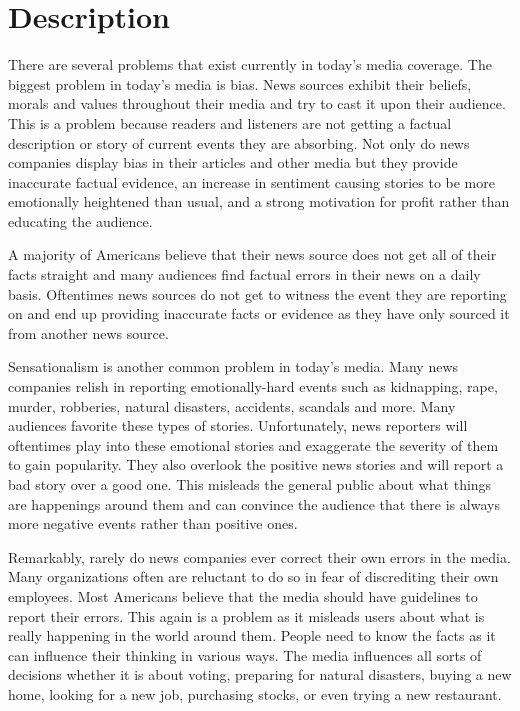 \documentclass[onecolumn, draftclsnofoot,10pt, compsoc]{IEEEtran}
\begin{document}
\section{Description}

There are several problems that exist currently in today’s media coverage.
 The biggest problem in today’s media is bias.
 News sources exhibit their beliefs, morals and values throughout their media and try to cast it upon their audience.
 This is a problem because readers and listeners are not getting a factual description or story of current events they are absorbing.
 Not only do news companies display bias in their articles and other media but they provide inaccurate factual evidence, an increase in sentiment causing stories to be more emotionally heightened than usual, and a strong motivation for profit rather than educating the audience.


A majority of Americans believe that their news source does not get all of their facts straight and many audiences find factual errors in their news on a daily basis.
 Oftentimes news sources do not get to witness the event they are reporting on and end up providing inaccurate facts or evidence as they have only sourced it from another news source.
 

Sensationalism is another common problem in today’s media.
 Many news companies relish in reporting emotionally-hard events such as kidnapping, rape, murder, robberies, natural  disasters, accidents, scandals and more.
 Many audiences favorite these types of stories.
 Unfortunately, news reporters will oftentimes play into these emotional stories and exaggerate the severity of them to gain popularity.
 They also overlook the positive news stories and will report a bad story over a good one.
 This misleads the general public about what things are happenings around them and can convince the audience that there is always more negative events rather than positive ones.


Remarkably, rarely do news companies ever correct their own errors in the media.
 Many organizations often are reluctant to do so in fear of discrediting their own employees.
 Most Americans believe that the media should have guidelines to report their errors.
 This again is a problem as it misleads users about what is really happening in the world around them.
 People need to know the facts as it can influence their thinking in various ways.
 The media influences all sorts of decisions whether it is about voting, preparing for natural disasters, buying a new  home, looking for a  new job, purchasing stocks, or even trying a new restaurant.
\end{document}
